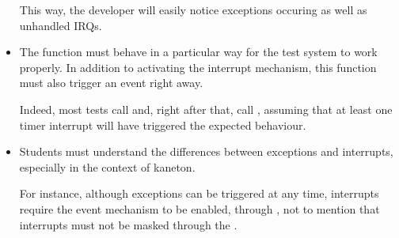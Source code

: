 \begin{itemize}
    \-

    This way, the developer will easily notice exceptions occuring as well
    as unhandled IRQs.
  \item
    The  function must behave in a particular way
    for the test system to work properly. In addition to activating the
    interrupt mechanism, this function must also trigger an event
    right away.

    \-

    Indeed, most tests call  and, right after that,
    call , assuming that at least one timer interrupt
    will have triggered the expected behaviour.
  \item
    Students must understand the differences between exceptions and
    interrupts, especially in the context of kaneton.

    \-

    For instance, although exceptions can be triggered at any time,
    interrupts require the event mechanism to be enabled, through
    , not to mention that interrupts must
    not be masked through the .
\end{itemize}
